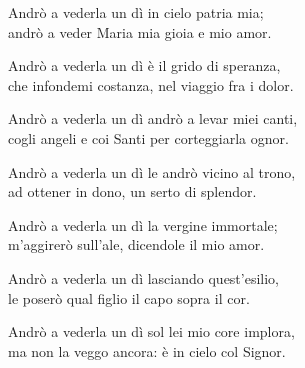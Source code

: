 
\strofa Andrò a vederla un dì in cielo patria mia;\\
andrò a veder Maria mia gioia e mio amor.

\spazio

 

\spazio

\strofa Andrò a vederla un dì è il grido di speranza,\\
che infondemi costanza, nel viaggio fra i dolor.

\spazio


\spazio

\strofa Andrò a vederla un dì andrò a levar miei canti,\\
cogli angeli e coi Santi per corteggiarla ognor.

\spazio


\spazio

\strofa Andrò a vederla un dì le andrò vicino al trono,\\
ad ottener in dono, un serto di splendor.

\spazio


\spazio

\strofa Andrò a vederla un dì la vergine immortale;\\
m'aggirerò sull'ale, dicendole il mio amor.

\spazio


\spazio

\strofa Andrò a vederla un dì lasciando quest'esilio,\\
le poserò qual figlio il capo sopra il cor.

\spazio


\spazio

\strofa Andrò a vederla un dì sol lei mio core implora,\\
ma non la veggo ancora: è in cielo col Signor.

\spazio

